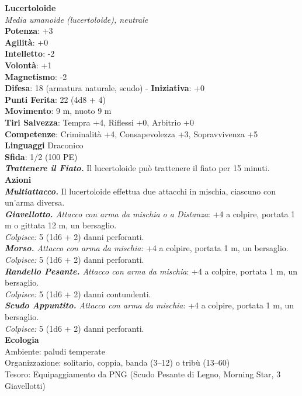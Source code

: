 \begin{multicols}{2}
\medskip\textbf{Lucertoloide}\\
\emph{Media umanoide (lucertoloide), neutrale}\\
\textbf{Potenza}: +3\\
\textbf{Agilità}: +0\\
\textbf{Intelletto}: -2\\
\textbf{Volontà}: +1\\
\textbf{Magnetismo}: -2\\
\textbf{Difesa}: 18 (armatura naturale, scudo) - \textbf{Iniziativa}: +0\\
\textbf{Punti Ferita}: 22 (4d8 + 4)\\
\textbf{Movimento}: 9 m, nuoto 9 m\\
\textbf{Tiri Salvezza}: Tempra +4, Riflessi +0, Arbitrio +0\\
\textbf{Competenze}: Criminalità +4, Consapevolezza +3, Sopravvivenza +5\\
\textbf{Linguaggi} Draconico\\
\textbf{Sfida}: 1/2 (100 PE)\smallskip\\

\emph{\textbf{Trattenere il Fiato.}} Il lucertoloide può trattenere il fiato per 15 minuti.\\
\smallskip\textbf{Azioni}\\
\emph{\textbf{Multiattacco.}} Il lucertoloide effettua due attacchi in mischia, ciascuno con un'arma diversa.\\
\emph{\textbf{Giavellotto.} Attacco con arma da mischia o a Distanza}: +4 a colpire, portata 1 m o gittata 12 m, un bersaglio. \\
\emph{Colpisce:} 5 (1d6 + 2) danni perforanti.\\
\emph{\textbf{Morso.} Attacco con arma da mischia}: +4 a colpire, portata 1 m, un bersaglio.\\
\emph{Colpisce:} 5 (1d6 + 2) danni perforanti.\\
\emph{\textbf{Randello Pesante.} Attacco con arma da mischia}: +4 a colpire, portata 1 m, un bersaglio.\\
\emph{Colpisce:} 5 (1d6 + 2) danni contundenti. \\
\emph{\textbf{Scudo Appuntito.} Attacco con arma da mischia}: +4 a colpire, portata 1 m, un bersaglio.\\
\emph{Colpisce:} 5 (1d6 + 2) danni perforanti.\\
\textbf{Ecologia}\\
Ambiente: paludi temperate\\
Organizzazione: solitario, coppia, banda (3–12) o tribù (13–60)\\
Tesoro: Equipaggiamento da PNG (Scudo Pesante di Legno, Morning Star, 3 Giavellotti)\\


\end{multicols}
